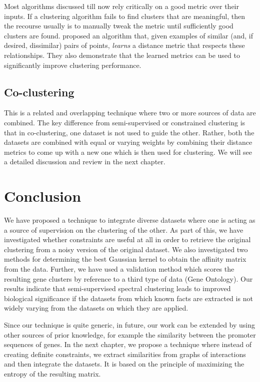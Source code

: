 Most algorithms discussed till now rely critically on a good metric over their inputs. If a clustering algorithm fails to find clusters that are meaningful, then the recourse usually is to manually tweak the metric until sufficiently good clusters are found. \citet{xing2003metric} proposed an algorithm that, given examples of similar (and, if desired, dissimilar) pairs of points, \textit{learns} a distance metric that respects these relationships. They also demonstrate that the learned metrics can be used to significantly improve clustering performance. 

\subsection{Co-clustering}
This is a related and overlapping technique where two or more sources of data are combined. The key difference from semi-supervised or constrained clustering is that in co-clustering, one dataset is not used to guide the other. Rather, both the datasets are combined with equal or varying weights by combining their distance metrics to come up with a new one which is then used for clustering. We will see a detailed discussion and review in the next chapter.

\section{Conclusion}

We have proposed a technique to integrate diverse datasets where one is acting as a source of supervision on the clustering of the other. 
As part of this, we have investigated whether constraints are useful at all in order to retrieve the original clustering from a noisy version of the original dataset. We also investigated 
two methods for determining the best Gaussian kernel to obtain the affinity matrix from the data. Further, we have used a validation method which scores the resulting gene clusters 
by reference to a third type of data (Gene Ontology). Our results indicate that semi-supervised spectral clustering leads to improved biological significance if the datasets from 
which known facts are extracted is not widely varying from the datasets on which they are applied.  

Since our technique is quite generic, in future, our work can be extended by using other sources of prior knowledge, for example the similarity between 
the promoter sequences of genes. In the next chapter, we propose a technique where instead of creating definite constraints, we extract similarities from graphs of interactions and 
then integrate the datasets. It is based on the principle of maximizing the entropy of the resulting matrix. 

